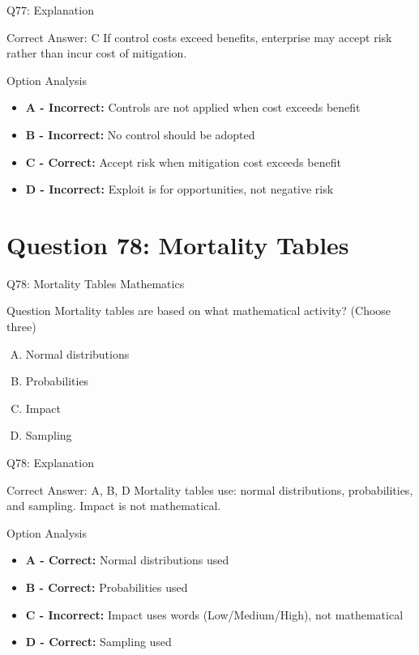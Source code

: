 \documentclass{beamer}
\begin{document}
	\begin{frame}{Q77: Explanation}
		\begin{block}{Correct Answer: C}
			If control costs exceed benefits, enterprise may accept risk rather than incur cost of mitigation.
		\end{block}
		\begin{block}{Option Analysis}
			\begin{itemize}
				\item \textbf{A - Incorrect:} Controls are not applied when cost exceeds benefit
				\item \textbf{B - Incorrect:} No control should be adopted
				\item \textbf{C - Correct:} Accept risk when mitigation cost exceeds benefit
				\item \textbf{D - Incorrect:} Exploit is for opportunities, not negative risk
			\end{itemize}
		\end{block}
	\end{frame}
	
	\section{Question 78: Mortality Tables}
	
	\begin{frame}{Q78: Mortality Tables Mathematics}
		\begin{block}{Question}
			Mortality tables are based on what mathematical activity? (Choose three)
		\end{block}
		\begin{enumerate}[(A)]
			\item Normal distributions
			\item Probabilities
			\item Impact
			\item Sampling
		\end{enumerate}
	\end{frame}
	
	\begin{frame}{Q78: Explanation}
		\begin{block}{Correct Answer: A, B, D}
			Mortality tables use: normal distributions, probabilities, and sampling. Impact is not mathematical.
		\end{block}
		\begin{block}{Option Analysis}
			\begin{itemize}
				\item \textbf{A - Correct:} Normal distributions used
				\item \textbf{B - Correct:} Probabilities used
				\item \textbf{C - Incorrect:} Impact uses words (Low/Medium/High), not mathematical
				\item \textbf{D - Correct:} Sampling used
			\end{itemize}
		\end{block}
	\end{frame}
	
\end{document}
